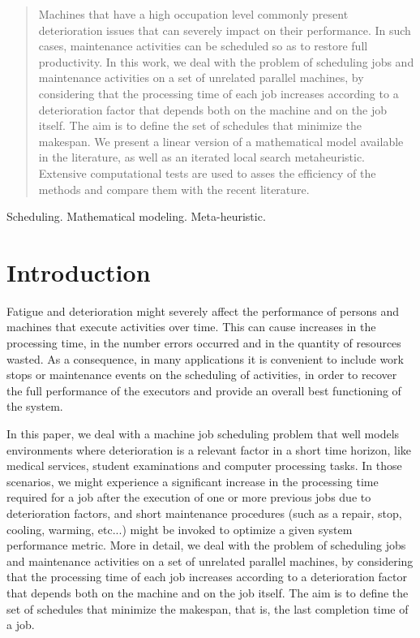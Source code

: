 \documentclass[a4paper,11pt]{article}
\begin{document}
\begin{abstract}
Machines that have a high occupation level commonly present deterioration issues that can severely impact on their performance. In such cases, maintenance activities can be scheduled so as to restore full productivity. In this work, we deal with the problem of scheduling jobs and maintenance activities on a set of unrelated parallel machines, by considering that the processing time of each job increases according to a deterioration factor that depends both on the machine and on the job itself. The aim is to define the set of schedules that minimize the makespan. 
We present a linear version of a mathematical model available in the literature, as well as an iterated local search metaheuristic. Extensive computational tests are used to asses the efficiency of the methods and compare them with the recent literature. 
\end{abstract}

\bigskip
\begin{keywords} Scheduling. Mathematical modeling. Meta-heuristic.

\bigskip
{}
\end{keywords}

\newpage
\section{Introduction} \label{sec:intro}
 
Fatigue and deterioration might severely affect the performance of persons and machines that execute activities over time. This can cause increases in the processing time, in the number errors occurred and in the quantity of resources wasted. As a consequence, in many applications it is convenient to include work stops or maintenance events on the scheduling of activities, in order to recover the full performance of the executors and provide an overall best functioning of the system. 
 
 In this paper, we deal with a machine job scheduling problem that well models environments where deterioration is a relevant factor in a short time horizon, like medical services, student examinations and computer processing tasks. In those scenarios, we might experience a significant increase in the processing time required for a job after the execution of one or more previous jobs due to deterioration factors, and short maintenance procedures (such as a repair, stop, cooling, warming, etc...) might be invoked to optimize a given system performance metric.  More in detail, we deal with the problem of scheduling jobs and maintenance activities on a set of unrelated parallel machines, by considering that the processing time of each job increases according to a deterioration factor that depends both on the machine and on the job itself. The aim is to define the set of schedules that minimize the makespan, that is, the last completion time of a job.
 
\end{document}
